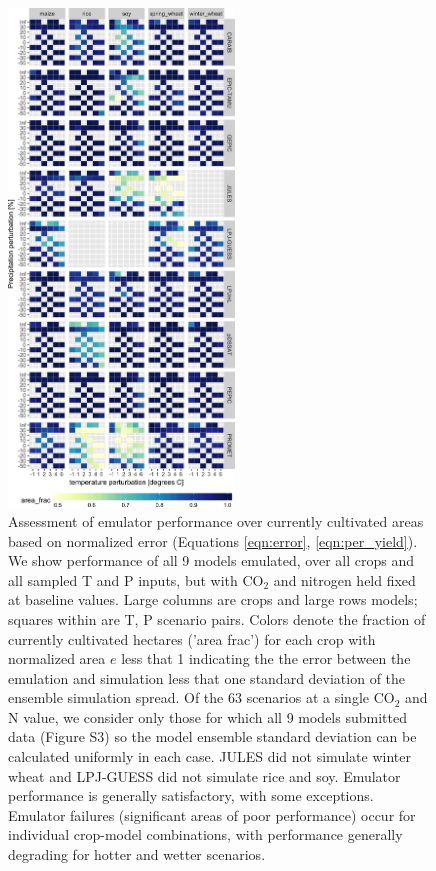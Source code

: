 \documentclass[gmd, manuscript]{copernicus} %
\begin{document}
\begin{figure}[ht]
\centering
    \includegraphics[width=6cm]{figures/error_360.png}
    \caption{Assessment of emulator performance over currently cultivated areas based on normalized error (Equations \ref{eqn:error}, \ref{eqn:per_yield}). 
    We show performance of all 9 models emulated, over all crops and all sampled T and P inputs, but with CO$_2$ and nitrogen held fixed at baseline values. 
    Large columns are crops and large rows models; squares within are T, P scenario pairs. 
    Colors denote the fraction of currently cultivated hectares ('area frac') for each crop with normalized area $e$ less that 1 indicating the the error between the emulation and simulation less that one standard deviation of the ensemble simulation spread. 
    Of the 63 scenarios at a single CO$_2$ and N value, we consider only those for which all 9 models submitted data (Figure S3) so the model ensemble standard deviation can be calculated uniformly in each case. 
    JULES did not simulate winter wheat and LPJ-GUESS did not simulate rice and soy. Emulator performance is generally satisfactory, with some exceptions. 
    Emulator failures (significant areas of poor performance) occur for individual crop-model combinations, with performance generally degrading for hotter and wetter scenarios.}
   \label{fig:error_360}
\end{figure}
\end{document}
